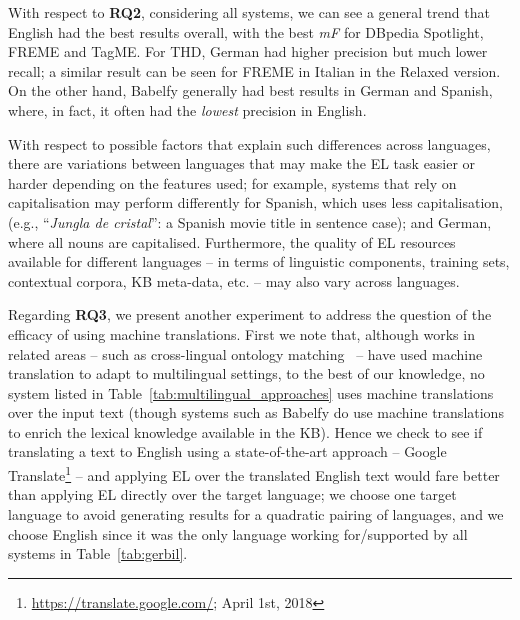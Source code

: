 \documentclass{llncs}
\begin{document}
With respect to \textbf{RQ2}, considering all systems, we can see a general trend that English had the best results overall, with the best \textit{mF} for DBpedia Spotlight, FREME and TagME. For THD, German had higher precision but much lower recall; a similar result can be seen for FREME in Italian in the Relaxed version. On the other hand, Babelfy generally had best results in German and Spanish, where, in fact, it often had the \textit{lowest} precision in English. 

With respect to possible factors that explain such differences across languages, there are variations between languages that may make the EL task easier or harder depending on the features used; for example, systems that rely on capitalisation may perform differently for Spanish, which uses less capitalisation, (e.g., ``\textit{Jungla de cristal}'': a Spanish movie title in sentence case); and German, where all nouns are capitalised. Furthermore, the quality of EL resources available for different languages -- in terms of linguistic components, training sets, contextual corpora, KB meta-data, etc. -- may also vary across languages.
\medskip

Regarding \textbf{RQ3}, we present another experiment to address the question of the efficacy of using machine translations. First we note that, although works in related areas -- such as cross-lingual ontology matching~\cite{FuBO10} -- have used machine translation to adapt to multilingual settings, to the best of our knowledge, no system listed in Table~\ref{tab:multilingual_approaches} uses machine translations over the input text (though systems such as Babelfy do use machine translations to enrich the lexical knowledge available in the KB). Hence we check to see if translating a text to English using a state-of-the-art approach -- Google Translate\footnote{\url{https://translate.google.com/}; April 1st, 2018} -- and applying EL over the translated English text would fare better than applying EL directly over the target language; we choose one target language to avoid generating results for a quadratic pairing of languages, and we choose English since it was the only language working for/supported by all systems in Table~\ref{tab:gerbil}.
\end{document}
